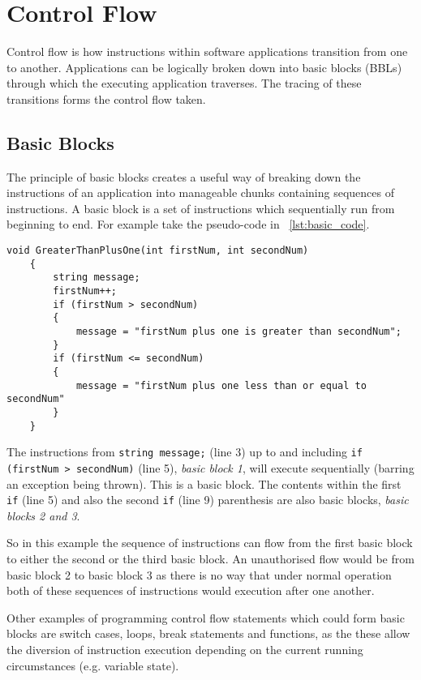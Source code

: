 \section{Control Flow}
Control flow is how instructions within software applications transition from one to another. Applications can be logically broken down into basic blocks (BBLs) through which the executing application traverses. The tracing of these transitions forms the control flow taken.

\subsection{Basic Blocks}
The principle of basic blocks creates a useful way of breaking down the instructions of an application into manageable chunks containing sequences of instructions. A basic block is a set of instructions which sequentially run from beginning to end. For example take the pseudo-code in ~\ref{lst:basic_code}.

\begin{lstlisting}[language={[Sharp]C},caption={An example of code which can be broken down into basic blocks},label={lst:basic_code}]
void GreaterThanPlusOne(int firstNum, int secondNum)
    {
        string message;
        firstNum++;
        if (firstNum > secondNum)
        {
            message = "firstNum plus one is greater than secondNum";
        }
        if (firstNum <= secondNum)
        {
            message = "firstNum plus one less than or equal to secondNum"
        }
    }
\end{lstlisting}

The instructions from \verb|string message;| (line 3) up to and including \verb|if (firstNum > secondNum)| (line 5), \textit{basic block 1}, will execute sequentially (barring an exception being thrown). This is a basic block. The contents within the first \verb|if| (line 5) and also the second \verb|if| (line 9) parenthesis are also basic blocks, \textit{basic blocks 2 and 3}.

So in this example the sequence of instructions can flow from the first basic block to either the second or the third basic block. An unauthorised flow would be from basic block 2 to basic block 3 as there is no way that under normal operation both of these sequences of instructions would execution after one another.

Other examples of programming control flow statements which could form basic blocks are switch cases, loops, break statements and functions, as the these allow the diversion of instruction execution depending on the current running circumstances (e.g. variable state).

